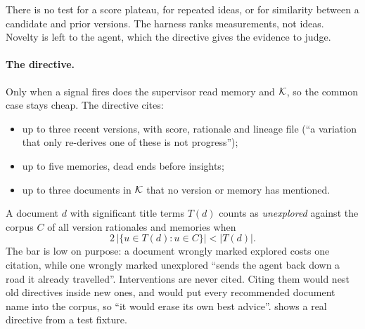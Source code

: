 There is no test for a score plateau, for repeated ideas, or for similarity between a candidate and
prior versions. The harness ranks measurements, not ideas. Novelty is left to the agent, which the
directive gives the evidence to judge.

\paragraph{The directive.} Only when a signal fires does the supervisor read memory and $\mathcal{K}$, so the
common case stays cheap. The directive cites:
\begin{itemize}[leftmargin=*,itemsep=1pt]
  \item up to three recent versions, with score, rationale and lineage file (``a variation that only
    re-derives one of these is not progress'');
  \item up to five memories, dead ends before insights;
  \item up to three documents in $\mathcal{K}$ that no version or memory has mentioned.
\end{itemize}
A document $d$ with significant title terms $T(d)$ counts as \emph{unexplored} against the corpus
$C$ of all version rationales and memories when
\begin{equation}
  2\,\big|\{u \in T(d) : u \in C\}\big| < |T(d)|.
\end{equation}
The bar is low on purpose: a document wrongly marked explored costs one citation, while one wrongly
marked unexplored ``sends the agent back down a road it already travelled''. Interventions are never
cited. Citing them would nest old directives inside new ones, and would put every recommended
document name into the corpus, so ``it would erase its own best advice''.  shows
a real directive from a test fixture.

